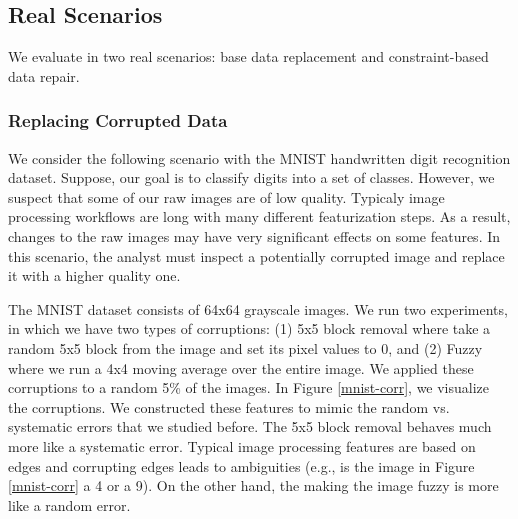 \subsection{Real Scenarios}
We evaluate \sys in two real scenarios: base data replacement and constraint-based data repair.

\subsubsection{Replacing Corrupted Data}
We consider the following scenario with the MNIST handwritten digit recognition dataset.
Suppose, our goal is to classify digits into a set of classes.
However, we suspect that some of our raw images are of low quality.
Typicaly image processing workflows are long with many different featurization steps.
As a result, changes to the raw images may have very significant effects on some features.
In this scenario, the analyst must inspect a potentially corrupted image and replace it with a higher quality one.

The MNIST dataset consists of 64x64 grayscale images.
We run two experiments, in which we have two types of corruptions: (1) 5x5 block removal where take a random 5x5 block from the image and set its pixel values to 0, and (2) Fuzzy where we run a 4x4 moving average over the entire image.
We applied these corruptions to a random 5\% of the images.
In Figure \ref{mnist-corr}, we visualize the corruptions.
We constructed these features to mimic the random vs. systematic errors that we studied before.
The 5x5 block removal behaves much more like a systematic error. 
Typical image processing features are based on edges and corrupting edges leads to ambiguities (e.g., is the image in Figure \ref{mnist-corr} a 4 or a 9).
On the other hand, the making the image fuzzy is more like a random error.

